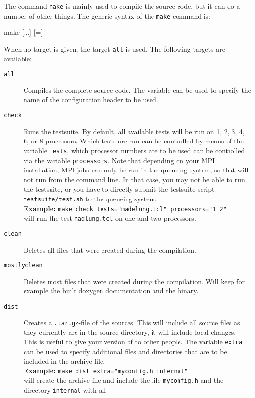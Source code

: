 The command \texttt{make} is mainly used to compile the \es{} source
code, but it can do a number of other things. The generic syntax of
the \texttt{make} command is:
\begin{code}
make [...] [=]
\end{code}
When no target is given, the target \texttt{all} is used. The
following targets are available:
\begin{description}
\item[\texttt{all}] Compiles the complete \es source code. The
  variable  can be used to specify the name of the
  configuration header to be used.
\item[\texttt{check}] Runs the testsuite. By default, all available
  tests will be run on 1, 2, 3, 4, 6, or 8 processors. Which tests are
  run can be controlled by means of the variable \texttt{tests}, which
  processor numbers are to be used can be controlled via the variable
  \texttt{processors}. Note that depending on your MPI installation,
  MPI jobs can only be run in the queueing system, so that \es{} will
  not run from the command line. In that case, you may not be able to
  run the testsuite, or you have to directly submit the testsuite script
  \verb!testsuite/test.sh! to the queueing system.\\
  \textbf{Example:} \verb!make check tests="madelung.tcl" processors="1 2"!\\
  will run the test \texttt{madlung.tcl} on one and two processors.
\item[\texttt{clean}] Deletes all files that were created during the
  compilation.
\item[\texttt{mostlyclean}] Deletes most files that were created
  during the compilation. Will keep for example the built doxygen
  documentation and the \es{} binary.
\item[\texttt{dist}] Creates a \texttt{.tar.gz}-file of the \es{}
  sources.  This will include all source files as they currently are
  in the source directory, \ie{} it will include local changes.  This
  is useful to give your version of \es{} to other people.
  The variable \texttt{extra} can be used to specify additional
  files and directories that are to be included in the archive
  file. \\
  \textbf{Example:} \verb!make dist extra="myconfig.h internal"!\\
  will create the archive file and include the file
  \texttt{myconfig.h} and the directory \texttt{internal} with all

\end{description}
